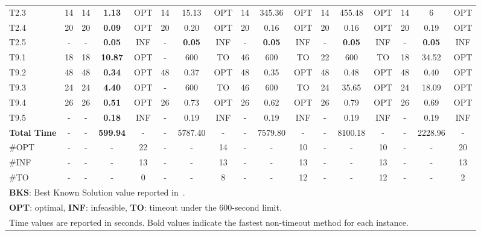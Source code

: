 \begin{table}[!htbp]
{\begin{tabular}{@{}l c ccc ccc ccc ccc ccc@{}}
T2.3 & 14 & 14 & \textbf{1.13} & OPT & 14 & 15.13 & OPT & 14 & 345.36 & OPT & 14 & 455.48 & OPT & 14 & 6 & OPT \\
T2.4 & 20 & 20 & \textbf{0.09} & OPT & 20 & 0.20 & OPT & 20 & 0.16 & OPT & 20 & 0.16 & OPT & 20 & 0.19 & OPT \\
T2.5 & - & - & \textbf{0.05} & INF & - & \textbf{0.05} & INF & - & \textbf{0.05} & INF & - & \textbf{0.05} & INF & - & \textbf{0.05} & INF \\
T9.1 & 18 & 18 & \textbf{10.87} & OPT & - & 600 & TO & 46 & 600 & TO & 22 & 600 & TO & 18 & 34.52 & OPT \\
T9.2 & 48 & 48 & \textbf{0.34} & OPT & 48 & 0.37 & OPT & 48 & 0.35 & OPT & 48 & 0.48 & OPT & 48 & 0.40 & OPT \\
T9.3 & 24 & 24 & \textbf{4.40} & OPT & - & 600 & TO & 46 & 600 & TO & 24 & 35.65 & OPT & 24 & 18.09 & OPT \\
T9.4 & 26 & 26 & \textbf{0.51} & OPT & 26 & 0.73 & OPT & 26 & 0.62 & OPT & 26 & 0.79 & OPT & 26 & 0.69 & OPT \\
T9.5 & - & - & \textbf{0.18} & INF & - & 0.19 & INF & - & 0.19 & INF & - & 0.19 & INF & - & 0.19 & INF \\
\midrule
\textbf{Total Time} & - & - & \textbf{599.94} & - & - & 5787.40 & - & - & 7579.80 & - & - & 8100.18 & - & - & 2228.96 & - \\
\#OPT & - & - & - & 22 & - & - & 14 & - & - & 10 & - & - & 10 & - & - & 20 \\
\#INF & - & - & - & 13 & - & - & 13 & - & - & 13 & - & - & 13 & - & - & 13 \\
\#TO & - & - & - & 0 & - & - & 8 & - & - & 12 & - & - & 12 & - & - & 2 \\
\bottomrule
\multicolumn{17}{l}{\footnotesize \textbf{BKS}: Best Known Solution value reported in~\cite{Gomez2023MO}.} \\
\multicolumn{17}{l}{\footnotesize \textbf{OPT}: optimal, \textbf{INF}: infeasible, \textbf{TO}: timeout under the 600-second limit.} \\
\multicolumn{17}{l}{\footnotesize Time values are reported in seconds. Bold values indicate the fastest non-timeout method for each instance.}
\end{tabular}%
}
\end{table}
